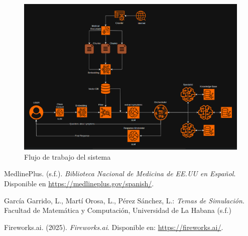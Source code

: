 \documentclass{llncs}
\begin{document}
\begin{figure}  
\begin{center}
  \includegraphics[scale=0.25]{assistant_workflow}
\end{center}
\caption{Flujo de trabajo del sistema}
\end{figure}
  
%
%
\begin{thebibliography}{5}
%
MedlinePlus. (s.f.). \textit{Biblioteca Nacional de Medicina de EE.UU en Español}. Disponible en
\url{https://medlineplus.gov/spanish/}.

García Garrido, L., Martí Orosa, L., Pérez Sánchez, L.: \textit{Temas de Simulación}. Facultad de Matemática y Computación, Universidad de La Habana (s.f.)

Fireworks.ai. (2025). \textit{Fireworks.ai}. Disponible en: \url{https://fireworks.ai/}.


\end{thebibliography}
\end{document}
